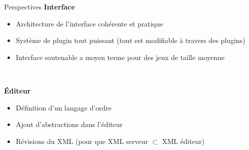 \documentclass[11pt]{beamer}
\begin{document}
\begin{frame}{Perspectives}
	\textbf{Interface}
	\begin{itemize}
		\item Architecture de l'interface cohérente et pratique
		\item Système de plugin tout puissant (tout est modifiable à travers des plugins)
		\item Interface soutenable a moyen terme pour des jeux de taille moyenne
	\end{itemize}
	
	~
	
	\textbf{Éditeur}
	\begin{itemize}
		\item Définition d'un langage d'ordre
		\item Ajout d'abstractions dans l'éditeur
		\item Révisions du XML (pour que XML serveur $\subset$ XML éditeur)
	\end{itemize}
\end{frame}
\end{document}
